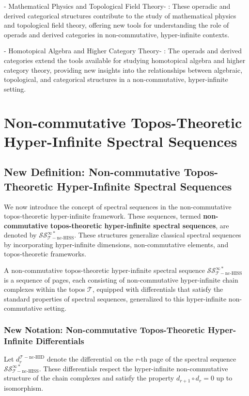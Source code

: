 \documentclass{article}
\begin{document}
-  Mathematical Physics and Topological Field Theory- : These operadic and derived categorical structures contribute to the study of mathematical physics and topological field theory, offering new tools for understanding the role of operads and derived categories in non-commutative, hyper-infinite contexts.

-  Homotopical Algebra and Higher Category Theory- : The operads and derived categories extend the tools available for studying homotopical algebra and higher category theory, providing new insights into the relationships between algebraic, topological, and categorical structures in a non-commutative, hyper-infinite setting.



\section{Non-commutative Topos-Theoretic Hyper-Infinite Spectral Sequences}
\subsection{New Definition: Non-commutative Topos-Theoretic Hyper-Infinite Spectral Sequences}
We now introduce the concept of spectral sequences in the non-commutative topos-theoretic hyper-infinite framework. These sequences, termed \textbf{non-commutative topos-theoretic hyper-infinite spectral sequences}, are denoted by \(\mathcal{SS}_{\mathcal{T}-\text{nc-HISS}}^{\infty *}\). These structures generalize classical spectral sequences by incorporating hyper-infinite dimensions, non-commutative elements, and topos-theoretic frameworks.

A non-commutative topos-theoretic hyper-infinite spectral sequence \(\mathcal{SS}_{\mathcal{T}-\text{nc-HISS}}^{\infty *}\) is a sequence of pages, each consisting of non-commutative hyper-infinite chain complexes within the topos \(\mathcal{T}\), equipped with differentials that satisfy the standard properties of spectral sequences, generalized to this hyper-infinite non-commutative setting.

\subsubsection{New Notation: Non-commutative Topos-Theoretic Hyper-Infinite Differentials}
Let \(d_{r}^{\mathcal{T}-\text{nc-HID}}\) denote the differential on the \(r\)-th page of the spectral sequence \(\mathcal{SS}_{\mathcal{T}-\text{nc-HISS}}^{\infty *}\). These differentials respect the hyper-infinite non-commutative structure of the chain complexes and satisfy the property \(d_{r+1} \circ d_{r} = 0\) up to isomorphism.
\end{document}
